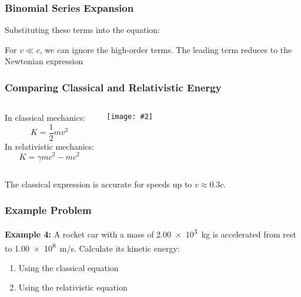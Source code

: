 \documentclass[12pt,compress,aspectratio=169]{beamer}
\newcommand{\pic}[2]{\texttt{[image: \#2]}}
\begin{document}
\begin{frame}
  \frametitle{Binomial Series Expansion}
  Substituting these terms into the equation:
  
  
  For $v\ll c$, we can ignore the high-order terms. The leading term reduces to
  the Newtonian expression
\end{frame}


\begin{frame}
  \frametitle{Comparing Classical and Relativistic Energy}
  \begin{columns}
    In classical mechanics:
    {\Large
      \begin{displaymath}
        K=\frac{1}{2} mv^2
      \end{displaymath}
    }
    In relativistic mechanics:
    {\Large
      \begin{displaymath}
        K=\gamma mc^2-mc^2
      \end{displaymath}
    }
    
    \pic{.85}{graphics/e_k.png}
  \end{columns}

  The classical expression is accurate for speeds up to $v\approx 0.3c$.
\end{frame}

\begin{frame}
  \frametitle{Example Problem}
  \textbf{Example 4:} A rocket car with a mass of \SI{2.00e3}{kg} is accelerated
  from rest to \SI{1.00e8}{m/s}. Calculate its kinetic energy:
  \begin{enumerate}
  \item Using the classical equation
  \item Using the relativistic equation
  \end{enumerate}
\end{frame}
\end{document}
